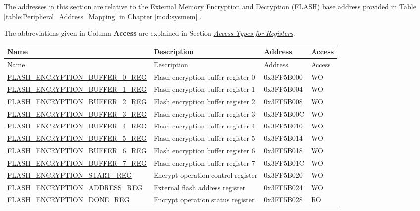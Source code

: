 \documentclass[main\_\_EN.tex]{subfiles}
\begin{document}
The addresses in this section are relative to the External Memory Encryption and Decryption (FLASH) base address provided in Table \ref{table:Peripheral_Address_Mapping} in Chapter \ref{mod:sysmem} \textit{}.

The abbreviations given in Column \textbf{Access} are explained in Section \hyperref[glossary-access-types]{\textit{Access Types for Registers}}.

\begin{longtable}{ | p{7cm} | p{5cm} | p{2cm} | p{1cm} | }
    \hline
    \rowcolor{lightgray}
    Name & Description &  Address & Access \\ \hline
            \endfirsthead
            \hline
            \rowcolor{lightgray}
    Name & Description &  Address & Access \\
            \hline
            \endhead
            \endfoot
    \hyperref[regdesc:FLASHENCRYPTIONBUFFERnREG]{FLASH\_ENCRYPTION\_BUFFER\_0\_REG} & Flash encryption buffer register 0 & 0x3FF5B000 & WO \\ \hline
    \hyperref[regdesc:FLASHENCRYPTIONBUFFERnREG]{FLASH\_ENCRYPTION\_BUFFER\_1\_REG} & Flash encryption buffer register 1 & 0x3FF5B004 & WO \\ \hline
    \hyperref[regdesc:FLASHENCRYPTIONBUFFERnREG]{FLASH\_ENCRYPTION\_BUFFER\_2\_REG} & Flash encryption buffer register 2 & 0x3FF5B008 & WO \\ \hline
    \hyperref[regdesc:FLASHENCRYPTIONBUFFERnREG]{FLASH\_ENCRYPTION\_BUFFER\_3\_REG} & Flash encryption buffer register 3 & 0x3FF5B00C & WO \\ \hline
    \hyperref[regdesc:FLASHENCRYPTIONBUFFERnREG]{FLASH\_ENCRYPTION\_BUFFER\_4\_REG} & Flash encryption buffer register 4 & 0x3FF5B010 & WO \\ \hline
    \hyperref[regdesc:FLASHENCRYPTIONBUFFERnREG]{FLASH\_ENCRYPTION\_BUFFER\_5\_REG} & Flash encryption buffer register 5 & 0x3FF5B014 & WO \\ \hline
    \hyperref[regdesc:FLASHENCRYPTIONBUFFERnREG]{FLASH\_ENCRYPTION\_BUFFER\_6\_REG} & Flash encryption buffer register 6 & 0x3FF5B018 & WO \\ \hline
    \hyperref[regdesc:FLASHENCRYPTIONBUFFERnREG]{FLASH\_ENCRYPTION\_BUFFER\_7\_REG} & Flash encryption buffer register 7 & 0x3FF5B01C & WO \\ \hline
    \hyperref[regdesc:FLASHENCRYPTIONSTARTREG]{FLASH\_ENCRYPTION\_START\_REG} & Encrypt operation control register & 0x3FF5B020 & WO \\ \hline
    \hyperref[regdesc:FLASHENCRYPTIONADDRESSREG]{FLASH\_ENCRYPTION\_ADDRESS\_REG} & External flash address register & 0x3FF5B024 & WO \\ \hline
    \hyperref[regdesc:FLASHENCRYPTIONDONEREG]{FLASH\_ENCRYPTION\_DONE\_REG} & Encrypt operation status register & 0x3FF5B028 & RO \\ \hline
    \end{longtable}
\end{document}
